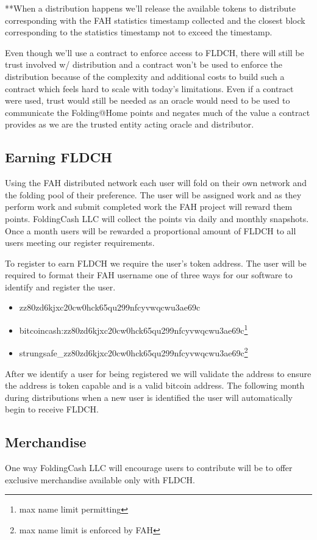 \documentclass[letterpaper,12pt,titlepage]{article}
\def\org{FoldingCash LLC}
\def\ticker{FLDCH}
\begin{document}
**When a distribution happens we'll release the available tokens to distribute corresponding with the FAH statistics timestamp collected and the closest block corresponding to the statistics timestamp not to exceed the timestamp.

Even though we'll use a contract to enforce access to \ticker{}, there will still be trust involved w/ distribution and a contract won't be used to enforce the distribution because of the complexity and additional costs to build such a contract which feels hard to scale with today's limitations. Even if a contract were used, trust would still be needed as an oracle would need to be used to communicate the Folding@Home points and negates much of the value a contract provides as we are the trusted entity acting oracle and distributor.

\subsection{Earning \ticker{}}
Using the FAH distributed network each user will fold on their own network and the folding pool of their preference. The user will be assigned work and as they perform work and submit completed work the FAH project will reward them points. \org{} will collect the points via daily and monthly snapshots. Once a month users will be rewarded a proportional amount of \ticker{} to all users meeting our register requirements.

To register to earn \ticker{} we require the user's token address. The user will be required to format their FAH username one of three ways for our software to identify and register the user.

\begin{itemize}
    \item zz80zd6kjxc20cw0hck65qu299nfcyvwqcwu3ae69c
    \item bitcoincash:zz80zd6kjxc20cw0hck65qu299nfcyvwqcwu3ae69c\footnote{max name limit permitting}
    \item strungsafe\_zz80zd6kjxc20cw0hck65qu299nfcyvwqcwu3ae69c\footnote{max name limit is enforced by FAH}
\end{itemize}

After we identify a user for being registered we will validate the address to ensure the address is token capable and is a valid bitcoin address. The following month during distributions when a new user is identified the user will automatically begin to receive \ticker{}.

\subsection{Merchandise}
One way \org{} will encourage users to contribute will be to offer exclusive merchandise available only with \ticker{}.
\end{document}
